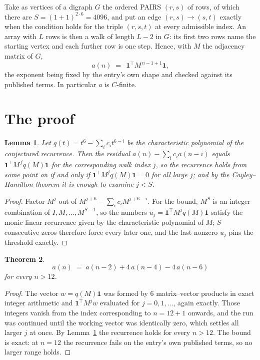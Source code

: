 \documentclass[11pt,a4paper]{article}
\theoremstyle{plain}
\newtheorem{theorem}{Theorem}
\newtheorem{lemma}[theorem]{Lemma}
\theoremstyle{definition}
\begin{document}
Take as vertices of a digraph $G$ the ordered PAIRS $(r,s)$ of rows, of which there are
$S=(1+1)^{2\cdot6}=4096$, and put an edge $(r,s)\to(s,t)$ exactly when the condition
holds for the triple $(r,s,t)$ at every admissible index. An array with $L$ rows is then a
walk of length $L-2$ in $G$: its first two rows name the starting vertex and each further
row is one step. Hence, with $M$ the adjacency matrix of $G$,
\[
a(n)\;=\;\,\mathbf{1}^{\!\top}M^{\,n-1+1}\mathbf{1},
\]
the exponent being fixed by the entry's own shape and checked against its published terms.
In particular $a$ is $C$-finite.

\section{The proof}

\begin{lemma}\label{lem:crit}
Let $q(t)=t^{6}-\sum_i c_it^{6-i}$ be the characteristic polynomial of the
conjectured recurrence. Then the residual $a(n)-\sum_ic_ia(n-i)$ equals
$\mathbf{1}^{\!\top}M^{\,j}q(M)\mathbf{1}$ for the corresponding walk index
$j$, so the recurrence holds from some point on if and only if
$\mathbf{1}^{\!\top}M^{j}q(M)\mathbf{1}=0$ for all large $j$; and by the
Cayley--Hamilton theorem it is enough to examine $j<S$.
\end{lemma}

\begin{proof}
Factor $M^{j}$ out of $M^{j+6}-\sum_ic_iM^{j+6-i}$. For the bound, $M^{S}$
is an integer combination of $I,M,\dots,M^{S-1}$, so the numbers
$u_j=\mathbf{1}^{\!\top}M^{j}q(M)\mathbf{1}$ satisfy the monic linear recurrence given by
the characteristic polynomial of $M$; $S$ consecutive zeros therefore force every later one,
and the last nonzero $u_j$ pins the threshold exactly.
\end{proof}

\begin{theorem}
\[
a(n)\;=\;a(n-2) + 4\,a(n-4) - 4\,a(n-6)
\]
for every $n>12$.
\end{theorem}

\begin{proof}
The vector $w=q(M)\mathbf{1}$ was formed by $6$ matrix--vector products in exact
integer arithmetic and $\mathbf{1}^{\!\top}M^{j}w$ evaluated for $j=0,1,\dots$, again
exactly. Those integers vanish from the index corresponding to $n=12+1$ onwards, and the
run was continued until the working vector was identically zero, which settles all larger $j$
at once. By Lemma~\ref{lem:crit} the recurrence holds for every $n>12$. The bound is exact: at $n=12$ the recurrence fails on the entry's own published terms, so no larger range holds.
\end{proof}
\end{document}
